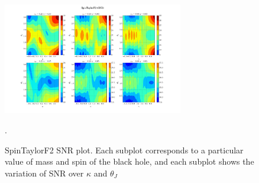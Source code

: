 \label{SNR}
\begin{figure}[h]
\includegraphics[width=0.7\textwidth]{./images/SNR_GRID_0F.pdf}
\centering
\caption{SpinTaylorF2 SNR plot. Each subplot corresponds to a particular value of mass and spin of the black hole, and each subplot shows the variation of SNR over $\kappa$ and $\theta_{J}$}.
\end{figure}

